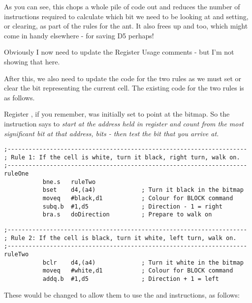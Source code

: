 As you can see, this chops a whole pile of code out and reduces the number of instructions required to calculate which bit we need to be looking at and setting, or clearing, as part of the rules for the ant. It also frees up  and  too, which might come in handy elsewhere - for saving D5 perhaps!

Obviously I now need to update the Register Usage comments - but I'm not showing that here.

After  this, we also need to update the code for the two rules as we must set or clear the bit representing the current cell. The existing code for the two rules is as follows.

Register , if you remember, was initially set to point at the  bitmap. So the  instruction says to \emph{start at the address held in register  and count from the most significant bit at that address,  bits - then test the bit that you arrive at.}


\begin{lstlisting}[firstnumber=293,caption={Langtons Ant - Existing Rule 1}]
;--------------------------------------------------------------------
; Rule 1: If the cell is white, turn it black, right turn, walk on.
;--------------------------------------------------------------------
ruleOne
           bne.s   ruleTwo
           bset    d4,(a4)             ; Turn it black in the bitmap
           moveq   #black,d1           ; Colour for BLOCK command
           subq.b  #1,d5               ; Direction - 1 = right
           bra.s   doDirection         ; Prepare to walk on

\end{lstlisting}



\begin{lstlisting}[firstnumber=303,caption={Langtons Ant - Existing Rule 2}]
;--------------------------------------------------------------------
; Rule 2: If the cell is black, turn it white, left turn, walk on.
;--------------------------------------------------------------------
ruleTwo
           bclr    d4,(a4)             ; Turn it white in the bitmap
           moveq   #white,d1           ; Colour for BLOCK command
           addq.b  #1,d5               ; Direction + 1 = left
\end{lstlisting}

These would be changed to allow them to use the  and  instructions, as follows:

